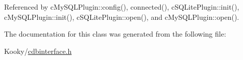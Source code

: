 Referenced by c\+My\+S\+Q\+L\+Plugin\+::config(), connected(), c\+S\+Q\+Lite\+Plugin\+::init(), c\+My\+S\+Q\+L\+Plugin\+::init(), c\+S\+Q\+Lite\+Plugin\+::open(), and c\+My\+S\+Q\+L\+Plugin\+::open().



The documentation for this class was generated from the following file\+:\begin{DoxyCompactItemize}
\item 
Kooky/\hyperlink{cdbinterface_8h}{cdbinterface.\+h}\end{DoxyCompactItemize}
